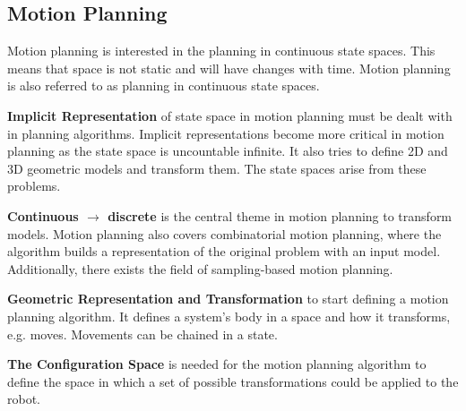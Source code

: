 \subsection{Motion Planning} \label{sec:Motion Planning}
Motion planning is interested in the planning in continuous state spaces. This means that space is not static and will have changes with time. Motion planning is also referred to as planning in continuous state spaces. \cite{planning_algorithms_steven_m_lavalle}

\textbf{Implicit Representation} of state space in motion planning must be dealt with in planning algorithms. Implicit representations become more critical in motion planning as the state space is uncountable infinite. It also tries to define 2D and 3D geometric models and transform them. The state spaces arise from these problems. \cite{planning_algorithms_steven_m_lavalle}

\textbf{Continuous $\rightarrow$ discrete} is the central theme in motion planning to transform models. Motion planning also covers combinatorial motion planning, where the algorithm builds a representation of the original problem with an input model. Additionally, there exists the field of sampling-based motion planning. \cite{planning_algorithms_steven_m_lavalle}

\textbf{Geometric Representation and Transformation} to start defining a motion planning algorithm. It defines a system's body in a space and how it transforms, e.g. moves. Movements can be chained in a state. \cite{planning_algorithms_steven_m_lavalle}

\textbf{The Configuration Space} is needed for the motion planning algorithm to define the space in which a set of possible transformations could be applied to the robot. \cite{planning_algorithms_steven_m_lavalle}

